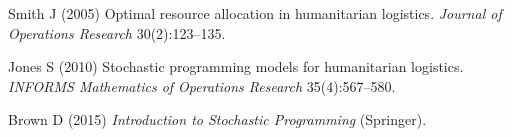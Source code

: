 \documentclass[ijds,sglanonrev]{informs4}
\begin{document}





%

\begin{thebibliography}{3}
\providecommand{\natexlab}[1]{#1}
\providecommand{\url}[1]{\texttt{#1}}
\providecommand{\urlprefix}{URL }

Smith J (2005) Optimal resource allocation in humanitarian logistics.
  \emph{Journal of Operations Research} 30(2):123--135.
  
Jones S (2010) Stochastic programming models for humanitarian logistics.
  \emph{INFORMS Mathematics of Operations Research} 35(4):567--580.

Brown D (2015) \emph{Introduction to Stochastic Programming} (Springer).

\end{thebibliography}


\end{document}
